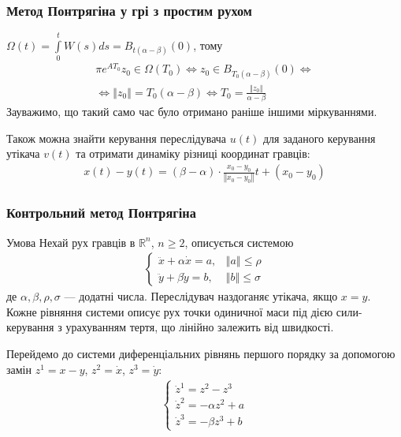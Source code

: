 \documentclass[10pt,pdf]{beamer}
\newcommand{\R}{\mathbb{R}}
\renewcommand{\d}[1]{\dot{#1}}
\newcommand{\dd}[1]{\ddot{#1}}
\newcommand{\norm}[1]{\left\Vert #1 \right\Vert}
\newcommand{\intl}{\int\limits}
\begin{document}
    \begin{frame}
        \frametitle{Метод Понтрягіна у грі з простим рухом}
        $\Omega(t) = \intl_0^t W(s)ds = B_{t(\alpha - \beta)}(0)$, тому
        \begin{gather*}
            \pi e^{AT_0} z_0 \in \Omega(T_0) \Leftrightarrow z_0 \in B_{T_0(\alpha - \beta)}(0) \Leftrightarrow 
            \\ \Leftrightarrow
            \norm{z_0} = T_0(\alpha - \beta) \Leftrightarrow T_0 = \frac{\norm{z_0}}{\alpha - \beta}
        \end{gather*}
        Зауважимо, що такий само час було отримано раніше іншими міркуваннями.

        Також можна знайти керування переслідувача $u(t)$ для заданого керування утікача $v(t)$ та отримати
        динаміку різниці координат гравців:
        \begin{gather*}
            x(t) - y(t) = (\beta - \alpha)\cdot \frac{x_0 - y_0}{\norm{x_0 - y_0}} t + (x_0 - y_0)
        \end{gather*}
    \end{frame}
    \begin{frame}
        \frametitle{Контрольний метод Понтрягіна}
    
        \begin{block}{Умова}
            Нехай рух гравців в $\R^n$, $n\geq 2$, описується системою
            \begin{gather*}
                \begin{cases}
                    \dd{x} + \alpha \d{x} = a, & \norm{a} \leq \rho \\
                    \dd{y} + \beta \d{y} = b, & \norm{b} \leq \sigma
                \end{cases}
            \end{gather*}
            де $\alpha, \beta, \rho, \sigma$ --- додатні числа. Переслідувач наздоганяє утікача, якщо $x=y$.
            Кожне рівняння системи описує рух точки одиничної маси під дією сили-керування з урахуванням тертя,
            що лінійно залежить від швидкості.
        \end{block}

        Перейдемо до системи диференціальних рівнянь першого порядку за допомогою замін $z^1 = x - y$, $z^2 = \d{x}$, $z^3 = \d{y}$:
        \begin{gather*}
            \begin{cases}
                \d{z}^1 = z^2 - z^3 \\
                \d{z}^2 = -\alpha z^2 + a \\
                \d{z}^3 = -\beta z^3 + b
            \end{cases}
        \end{gather*}
    \end{frame}
\end{document}
